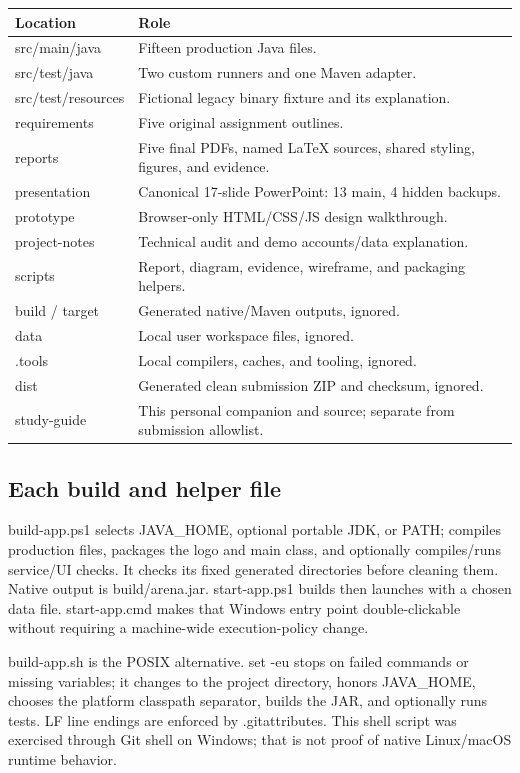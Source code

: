 \documentclass[12pt]{article}
\begin{document}
\begin{tabularx}{\linewidth}{lY}\toprule Location & Role\\\midrule
src/main/java & Fifteen production Java files.\\
src/test/java & Two custom runners and one Maven adapter.\\
src/test/resources & Fictional legacy binary fixture and its explanation.\\
requirements & Five original assignment outlines.\\
reports & Five final PDFs, named LaTeX sources, shared styling, figures, and evidence.\\
presentation & Canonical 17-slide PowerPoint: 13 main, 4 hidden backups.\\
prototype & Browser-only HTML/CSS/JS design walkthrough.\\
project-notes & Technical audit and demo accounts/data explanation.\\
scripts & Report, diagram, evidence, wireframe, and packaging helpers.\\
build / target & Generated native/Maven outputs, ignored.\\
data & Local user workspace files, ignored.\\
.tools & Local compilers, caches, and tooling, ignored.\\
dist & Generated clean submission ZIP and checksum, ignored.\\
study-guide & This personal companion and source; separate from submission allowlist.\\\bottomrule\end{tabularx}

\subsection{Each build and helper file}
build-app.ps1 selects JAVA\_HOME, optional portable JDK, or PATH; compiles production files, packages the logo and main class, and optionally compiles/runs service/UI checks. It checks its fixed generated directories before cleaning them. Native output is build/arena.jar. start-app.ps1 builds then launches with a chosen data file. start-app.cmd makes that Windows entry point double-clickable without requiring a machine-wide execution-policy change.

build-app.sh is the POSIX alternative. set -eu stops on failed commands or missing variables; it changes to the project directory, honors JAVA\_HOME, chooses the platform classpath separator, builds the JAR, and optionally runs tests. LF line endings are enforced by .gitattributes. This shell script was exercised through Git shell on Windows; that is not proof of native Linux/macOS runtime behavior.
\end{document}
